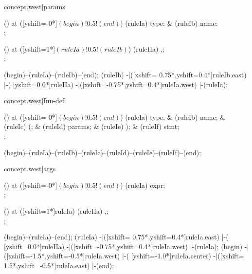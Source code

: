 \begin{syntax}[[xshift=22mm]concept.west]{params}
  
  \node[sequence,column sep=1.5cm] () at ([yshift=-0*\syntaxruledist]$(begin)!0.5!(end)$) {
    \node[nonterminal] (ruleIa) {type};
    &
    \node[terminal]    (ruleIb) {name};
    \\
  };
  
  \node[sequence,column sep=1.0cm] () at ([yshift=1*\syntaxruledist]$(ruleIa)!0.5!(ruleIb)$) {
    \node[terminal]    (ruleIIa) {,};
    \\
  };
  
  \draw[path] (begin)--(ruleIa)--(ruleIb)--(end);
  \draw[path] (ruleIb)
            -|([xshift= 0.75*\syntaxruledist,yshift=0.4*\syntaxruledist]ruleIb.east)
            |-(                            [yshift=0.0*\syntaxruledist]ruleIIa)
            -|([xshift=-0.75*\syntaxruledist,yshift=0.4*\syntaxruledist]ruleIa.west)
            |-(ruleIa);
\end{syntax}

\begin{syntax}[[xshift=22mm]concept.west]{fun-def}
  
  \node[sequence,column sep=1.2cm] () at ([yshift=-0*\syntaxruledist]$(begin)!0.5!(end)$) {
    \node[nonterminal] (ruleIa) {type};
    &
    \node[terminal]    (ruleIb) {name};
    &
    \node[terminal]    (ruleIc) {(};
    &
    \node[nonterminal] (ruleId) {params};
    &
    \node[terminal]    (ruleIe) {)};
    &
    \node[terminal]    (ruleIf) {stmt};
    \\
  };
  
  \draw[path] (begin)--(ruleIa)--(ruleIb)--(ruleIc)--(ruleId)--(ruleIe)--(ruleIf)--(end);
\end{syntax}
\begin{syntax}[[xshift=22mm]concept.west]{args}
  
  \node[sequence,column sep=1.5cm] () at ([yshift=-0*\syntaxruledist]$(begin)!0.5!(end)$) {
    \node[nonterminal] (ruleIa) {expr};
    \\
  };
  
  \node[sequence,column sep=1.0cm] () at ([yshift=1*\syntaxruledist]ruleIa) {
    \node[terminal]    (ruleIIa) {,};
    \\
  };
  
  \draw[path] (begin)--(ruleIa)--(end);
  \draw[path] (ruleIa)
            -|([xshift= 0.75*\syntaxruledist,yshift=0.4*\syntaxruledist]ruleIa.east)
            |-(                            [yshift=0.0*\syntaxruledist]ruleIIa)
            -|([xshift=-0.75*\syntaxruledist,yshift=0.4*\syntaxruledist]ruleIa.west)
            |-(ruleIa);
  \draw[path] (begin)
            -|([xshift=-1.5*\syntaxruledist,yshift=-0.5*\syntaxruledist]ruleIa.west)
            |-(                            [yshift=-1.0*\syntaxruledist]ruleIa.center)
            -|([xshift= 1.5*\syntaxruledist,yshift=-0.5*\syntaxruledist]ruleIa.east)
            |-(end);
\end{syntax}

